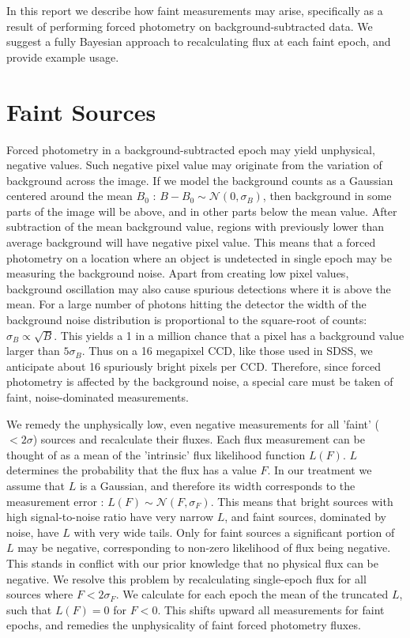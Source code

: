 \documentclass[fleqn,usenatbib]{mnras}  %
\begin{document}
In this report we describe how faint measurements may arise, specifically as a result of performing forced photometry on background-subtracted data. We suggest a fully Bayesian approach to recalculating flux at each faint epoch, and provide example usage. 


\section{Faint Sources}
\label{sec:faint_sources}

%
%



Forced photometry in a background-subtracted epoch may yield unphysical, negative values. Such negative pixel value may originate from the variation of background across the image. If we model the background counts  as a Gaussian centered around the mean  $B_{0}$ :   $B-B_{0}  \sim  \mathcal{N}(0,\sigma_{B})$, then background in some parts of the image will be above, and in other parts below the mean value. After subtraction of the mean background value, regions with previously lower than average background will have negative pixel value.  This means that a forced photometry on a location where an object is undetected in single epoch may be measuring the background noise. Apart from creating low pixel values, background oscillation may also cause spurious detections where it is above the mean. For a large number of photons hitting the detector the width of the background noise distribution is  proportional to the square-root of counts: $\sigma_{B} \propto \sqrt {B}$. This yields a 1 in a million chance that a pixel has a background value larger than $5\sigma_{B}$.   Thus on a 16 megapixel CCD, like those used in SDSS, we anticipate  about  16 spuriously bright pixels  per CCD.  Therefore,  since forced photometry is affected by  the background noise, a special care must be taken of faint, noise-dominated measurements. 


%
%

We remedy the unphysically low, even negative measurements for all 'faint' ($< 2\sigma$) sources and recalculate their fluxes. Each flux measurement can  be thought of as a  mean of the 'intrinsic' flux likelihood function $L(F)$. $L$ determines the probability that the flux has a value $F$. In our treatment we assume that $L$ is a Gaussian, and therefore its width corresponds to the measurement error :  $L(F) \sim \mathcal{N}(F,\sigma_{F})$. This means that bright sources with high signal-to-noise ratio have very narrow  $L$, and faint sources, dominated by noise, have $L$ with very wide tails.  Only for faint sources a significant portion of $L$ may be negative, corresponding to non-zero likelihood of flux being negative. This stands in conflict with our prior knowledge that no physical flux can be negative. We resolve this problem by recalculating single-epoch flux for all sources where $F < 2 \sigma_{F}$. We calculate for each epoch the mean of the truncated $L$, such that $L(F) = 0$ for $F<0$.  This shifts upward all measurements for faint epochs, and remedies the unphysicality of faint forced photometry fluxes.   
\end{document}
